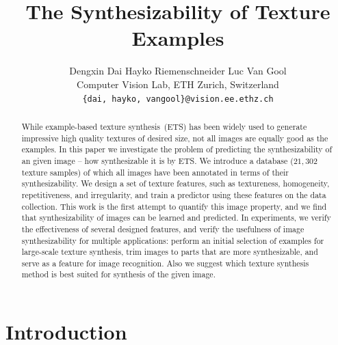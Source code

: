 \documentclass[10pt,twocolumn,letterpaper]{article}
\begin{document}
\title{ The Synthesizability of Texture Examples}
\author{Dengxin Dai \quad Hayko Riemenschneider \quad Luc Van Gool\\
Computer Vision Lab, ETH Zurich, Switzerland\\
{\tt\small \{dai, hayko, vangool\}@vision.ee.ethz.ch}
}

\maketitle

\begin{abstract}
  While example-based texture synthesis~(ETS) has been widely used to
  generate impressive high quality textures of desired size, not all
  images are equally good as the examples.  In this paper we
  investigate the problem of predicting the synthesizability of an
  given image -- how synthesizable it is by ETS.  We introduce a
  database ($21,302$ texture samples) of which all images have been
  annotated in terms of their synthesizability.  We design a set of
  texture features, such as textureness, homogeneity, repetitiveness,
  and irregularity, and train a predictor using these features on the
  data collection.  This work is the first attempt to quantify this
  image property, and we find that synthesizability of images can
  be learned and predicted.  In experiments, we verify the
  effectiveness of several designed features, and verify the
  usefulness of image synthesizability for multiple applications:
  perform an initial selection of examples for large-scale texture
  synthesis, trim images to parts that are more synthesizable, and
  serve as a feature for image recognition.  Also we suggest which
  texture synthesis method is best suited for synthesis of the given
  image.

\end{abstract}


\section{Introduction}
\end{document}
